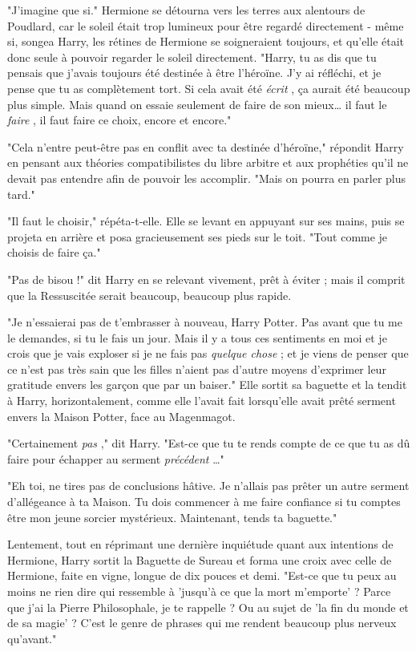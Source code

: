 "J'imagine que si." Hermione se détourna vers les terres aux alentours de Poudlard, car le soleil était trop lumineux pour être regardé directement - même si, songea Harry, les rétines de Hermione se soigneraient toujours, et qu'elle était donc seule à pouvoir regarder le soleil directement. "Harry, tu as dis que tu pensais que j'avais toujours été destinée à être l'héroïne. J'y ai réfléchi, et je pense que tu as complètement tort. Si cela avait été \emph{écrit} , ça aurait été beaucoup plus simple. Mais quand on essaie seulement de faire de son mieux… il faut le \emph{faire} , il faut faire ce choix, encore et encore."

"Cela n'entre peut-être pas en conflit avec ta destinée d'héroïne," répondit Harry en pensant aux théories compatibilistes du libre arbitre et aux prophéties qu'il ne devait pas entendre afin de pouvoir les accomplir. "Mais on pourra en parler plus tard."

"Il faut le choisir," répéta-t-elle. Elle se levant en appuyant sur ses mains, puis se projeta en arrière et posa gracieusement ses pieds sur le toit. "Tout comme je choisis de faire ça."

"Pas de bisou !" dit Harry en se relevant vivement, prêt à éviter ; mais il comprit que la Ressuscitée serait beaucoup, beaucoup plus rapide.

"Je n'essaierai pas de t'embrasser à nouveau, Harry Potter. Pas avant que tu me le demandes, si tu le fais un jour. Mais il y a tous ces sentiments en moi et je crois que je vais exploser si je ne fais pas \emph{quelque chose}  ; et je viens de penser que ce n'est pas très sain que les filles n'aient pas d'autre moyens d'exprimer leur gratitude envers les garçon que par un baiser." Elle sortit sa baguette et la tendit à Harry, horizontalement, comme elle l'avait fait lorsqu'elle avait prêté serment envers la Maison Potter, face au Magenmagot.

"Certainement \emph{pas} ," dit Harry. "Est-ce que tu te rends compte de ce que tu as dû faire pour échapper au serment \emph{précédent} …"

"Eh toi, ne tires pas de conclusions hâtive. Je n'allais pas prêter un autre serment d'allégeance à ta Maison. Tu dois commencer à me faire confiance si tu comptes être mon jeune sorcier mystérieux. Maintenant, tends ta baguette."

Lentement, tout en réprimant une dernière inquiétude quant aux intentions de Hermione, Harry sortit la Baguette de Sureau et forma une croix avec celle de Hermione, faite en vigne, longue de dix pouces et demi. "Est-ce que tu peux au moins ne rien dire qui ressemble à 'jusqu'à ce que la mort m'emporte' ? Parce que j'ai la Pierre Philosophale, je te rappelle ? Ou au sujet de 'la fin du monde et de sa magie' ? C'est le genre de phrases qui me rendent beaucoup plus nerveux qu'avant."

